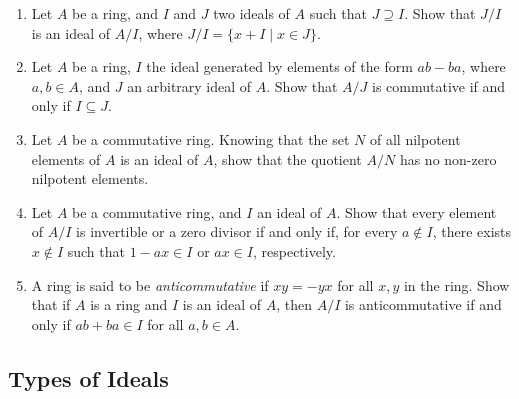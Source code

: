 \documentclass[11pt,a4paper]{article}
\begin{document}
\begin{eje}
\begin{enumerate}[label=(\roman*)]
\item Let \( A \) be a ring, and \( I \) and \( J \) two ideals of \( A \) such that \( J \supseteq I \). Show that \( J/I \) is an ideal of \( A/I \), where \( J/I = \{x + I \mid x \in J\} \).

\item  Let \( A \) be a ring, \( I \) the ideal generated by elements of the form \( ab - ba \), where \( a, b \in A \), and \( J \) an arbitrary ideal of \( A \). Show that \( A / J \) is commutative if and only if \( I \subseteq J \).

\item Let \( A \) be a commutative ring. Knowing  that the set \( N \) of all nilpotent elements of \( A \) is an ideal of \( A \), show that the quotient \( A / N \) has no non-zero nilpotent elements.

\item Let \( A \) be a commutative ring, and \( I \) an ideal of \( A \). Show that every element of \( A / I \) is invertible or a zero divisor if and only if, for every \( a \notin I \), there exists \( x \notin I \) such that \( 1 - ax \in I \) or \( ax \in I \), respectively.


\item A ring is said to be \textit{anticommutative} if \( xy = -yx \) for all \( x, y \) in the ring. Show that if \( A \) is a ring and \( I \) is an ideal of \( A \), then \( A / I \) is anticommutative if and only if \( ab + ba \in I \) for all \( a, b \in A \).

\end{enumerate}
\end{eje}

\subsection{Types of Ideals}
\end{document}
